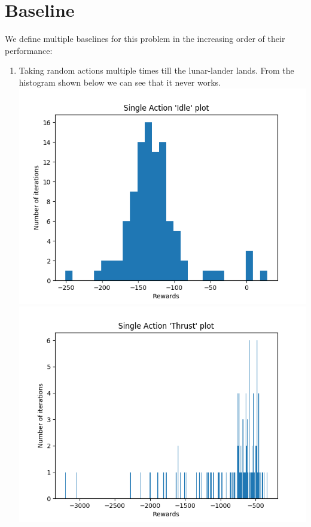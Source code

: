 \documentclass[12pt]{article}
\begin{document}
\section{Baseline}
We define multiple baselines for this problem in the increasing order of their performance:
\begin{enumerate}[label=(\alph*)]
\item Taking random actions multiple times till the lunar-lander lands. From the histogram shown below we can see that it never works.
\newline
\includegraphics[scale=0.3]{images/idle_action.png} \includegraphics[scale=0.3]{images/thrust_action.png}

\end{enumerate}
\end{document}
